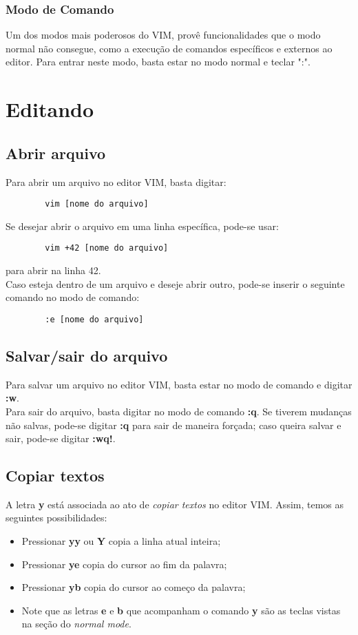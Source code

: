 \documentclass[12pt]{article}
\begin{document}
		\subsubsection{Modo de Comando}
		Um dos modos mais poderosos do VIM, provê funcionalidades que o modo normal não consegue, como a execução de comandos específicos e externos ao editor. Para entrar neste modo, basta estar no modo normal e teclar ":". 
	\newpage

\section{Editando}
	\subsection{Abrir arquivo}
	Para abrir um arquivo no editor VIM, basta digitar:
	\begin{lstlisting}
		vim [nome do arquivo]
	\end{lstlisting}
	Se desejar abrir o arquivo em uma linha específica, pode-se usar:
	\begin{lstlisting}
		vim +42 [nome do arquivo]
	\end{lstlisting}
	para abrir na linha 42. \\
	Caso esteja dentro de um arquivo e deseje abrir outro, pode-se inserir o seguinte comando no modo de comando:
	\begin{lstlisting}
		:e [nome do arquivo]
	\end{lstlisting} 
	\subsection{Salvar/sair do arquivo}
	Para salvar um arquivo no editor VIM, basta estar no modo de comando e digitar \textbf{:w}. \\
	Para sair do arquivo, basta digitar no modo de comando \textbf{:q}. Se tiverem mudanças não salvas, pode-se digitar \textbf{:q} para sair de maneira forçada; caso queira salvar e sair, pode-se digitar \textbf{:wq!}. 
	\subsection{Copiar textos}
	A letra \textbf{y} está associada ao ato de \emph{copiar textos} no editor VIM. Assim, temos as seguintes possibilidades:
	\begin{itemize}
		\item Pressionar \textbf{yy} ou \textbf{Y} copia a linha atual inteira;
		\item Pressionar \textbf{ye} copia do cursor ao fim da palavra;
		\item Pressionar \textbf{yb} copia do cursor ao começo da palavra;
		\item Note que as letras \textbf{e} e \textbf{b} que acompanham o comando \textbf{y} são as teclas vistas na seção do \emph{normal mode}.
	\end{itemize}
\end{document}
